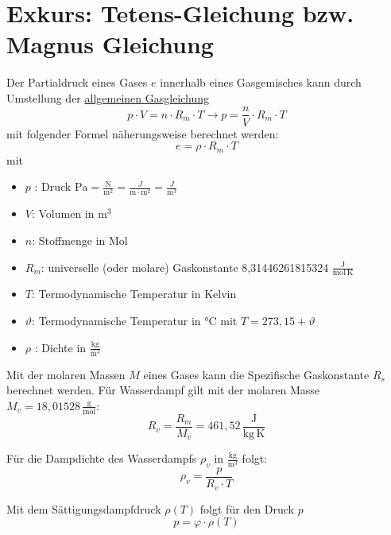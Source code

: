 \section{Exkurs: Tetens-Gleichung bzw. Magnus Gleichung}

Der Partialdruck eines Gases $e$ innerhalb eines Gasgemisches kann durch Umstellung der  \href{https://de.wikipedia.org/wiki/Thermische_Zustandsgleichung_idealer_Gase}{allgemeinen Gasgleichung} 
\begin{equation}
    p \cdot V = n \cdot R_{m} \cdot T  \rightarrow   p = \frac{n}{V} \cdot R_m \cdot T
\end{equation}
mit folgender Formel näherungsweise berechnet werden:
\begin{equation}
    e = \rho \cdot R_m \cdot T
\end{equation}
mit
\begin{itemize}
    \item  $p$ : Druck $\text{Pa} = \frac{\text{N}}{\text{m}^2} = \frac{J}{\text{m} \cdot \text{m}^2} = \frac{J}{\text{m}^3}$ 
    \item  $V$: Volumen in $\text{m}^3$ 
    \item  $n$: Stoffmenge in Mol 
    \item  $R_{m}$: universelle (oder molare) Gaskonstante 8,31446261815324 $\frac{\mathrm{J}}{\mathrm{mol} \ \mathrm{K}}$ 
    \item  $T$: Termodynamische Temperatur in Kelvin 
    \item $\vartheta$: Termodynamische Temperatur in °C mit $T = 273{,}15 +  \vartheta$
    \item $\rho$ : Dichte in $\frac{\text{kg}}{\text{m}^3}$
\end{itemize} 

Mit der molaren Massen $M$ eines Gases kann die Spezifische Gaskonstante $R_s$ berechnet werden. Für Wasserdampf gilt mit der molaren Masse $M_v = 18{,}01528\, \frac{\text{g}}{\text{mol}}$:
\begin{equation}
    R_v = \frac{R_m}{M_v} = 461{,}52\, \frac{\text{J}}{\text{kg}\,\text{K}} 
\end{equation}


Für die Dampdichte des Wasserdampfs $\rho_v$ in $\frac{\mathrm{kg}}{\mathrm{m^3}}$  folgt:
\begin{equation}
    \rho_v = \frac{p}{R_v \cdot T}
\end{equation}

Mit dem Sättigungsdampfdruck $\rho(T)$ folgt für den Druck  $p$
\begin{equation}
    p = \varphi \cdot \rho(T)
\end{equation}

